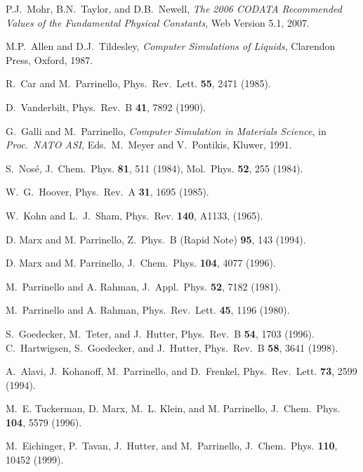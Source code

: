 \documentclass[twoside,10pt,titlepage,a4paper]{article}
\begin{document}
\begin{thebibliography}{999}


  P.J.~Mohr, B.N.~Taylor, and D.B.~Newell,
  {\em The 2006 CODATA Recommended Values of the 
  Fundamental Physical Constants},
  Web Version 5.1, 2007.

    M.P.~Allen and D.J.~Tildesley,
    {\em Computer Simulations of Liquids},
    Clarendon Press, Oxford, 1987.

    R.~Car and M.~Parrinello,
    Phys.~Rev.~Lett. {\bf 55}, 2471 (1985).

    D.~Vanderbilt, Phys.~Rev.~B {\bf 41}, 7892 (1990).

 G.~Galli and M.~Parrinello, 
{\it Computer Simulation in Materials Science}, in {\em Proc.\ NATO ASI}, Eds.\ M.~Meyer and V.~Pontikis, 
    Kluwer, 1991.

    S.~Nos\'e, J.~Chem.~Phys. {\bf 81}, 511 (1984),
    Mol.~Phys. {\bf 52}, 255 (1984).

    W.~G.~Hoover, Phys.~Rev.~A {\bf 31}, 1695 (1985).

    W.~Kohn and L.~J.~Sham, Phys.~Rev. {\bf 140}, A1133, (1965).

    D. Marx and M. Parrinello,
    Z.~Phys.~B (Rapid Note) {\bf 95}, 143 (1994).

    D. Marx and M. Parrinello,
    J.~Chem.~Phys. {\bf 104}, 4077 (1996).

    M.~Parrinello and A. Rahman,
    J.~Appl.~Phys. {\bf 52}, 7182 (1981).

    M.~Parrinello and A. Rahman,
    Phys.~Rev.~Lett. {\bf 45}, 1196 (1980).

    S.~Goedecker, M.~Teter, and J.~Hutter, Phys.~Rev.~B {\bf 54}, 1703 (1996).\\
    C.~Hartwigsen, S.~Goedecker, and J.~Hutter, Phys.~Rev.~B {\bf 58}, 3641 (1998).

    A.~Alavi, J.~Kohanoff, M.~Parrinello, and D.~Frenkel,
    Phys.~Rev.~Lett. {\bf 73}, 2599 (1994).

    M.~E. Tuckerman, D. Marx, M.~L. Klein, and M. Parrinello,
    J.~Chem.~Phys. {\bf 104}, 5579 (1996).

 M.~Eichinger, P.~Tavan, J.~Hutter, and M.~Parrinello,
    J.~Chem.~Phys. {\bf 110}, 10452 (1999).


\end{thebibliography}
\end{document}

